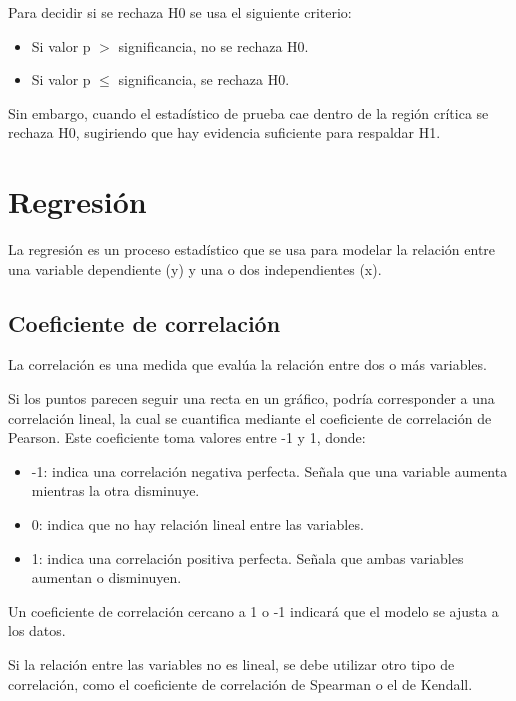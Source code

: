 \documentclass[a4paper, 12pt]{book}
\begin{document}
Para decidir si se rechaza H0 se usa el siguiente criterio:
\begin{itemize}
	\item Si valor p $>$ significancia, no se rechaza H0.
	\item Si valor p $\leqslant$ significancia, se rechaza H0.
\end{itemize}
Sin embargo, cuando el estadístico de prueba cae dentro de la región crítica se rechaza H0, sugiriendo que hay evidencia suficiente para respaldar H1.

\section{Regresión}
La regresión es un proceso estadístico que se usa para modelar la relación entre una variable dependiente (y) y una o dos independientes (x).

\subsection{Coeficiente de correlación}
La correlación es una medida que evalúa la relación entre dos o más variables.

Si los puntos parecen seguir una recta en un gráfico, podría corresponder a una correlación lineal, la cual se cuantifica mediante el coeficiente de correlación de Pearson. Este coeficiente toma valores entre -1 y 1, donde:
\begin{itemize}
	\item -1: indica una correlación negativa perfecta. Señala que una variable aumenta mientras la otra disminuye.
	\item 0: indica que no hay relación lineal entre las variables.
	\item 1: indica una correlación positiva perfecta. Señala que ambas variables aumentan o disminuyen.
\end{itemize}
Un coeficiente de correlación cercano a 1 o -1 indicará que el modelo se ajusta a los datos.

Si la relación entre las variables no es lineal, se debe utilizar otro tipo de correlación, como el coeficiente de correlación de Spearman o el de Kendall.
\end{document}

